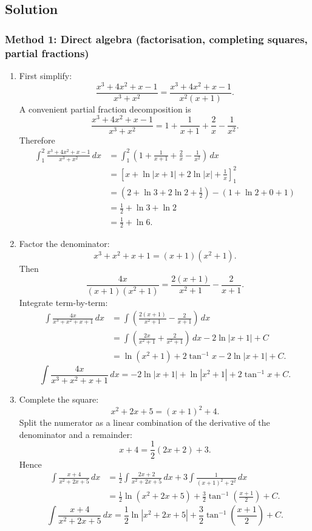 \documentclass[12pt]{article}
\begin{document}
\subsection*{Solution}

\subsubsection*{Method 1: Direct algebra (factorisation, completing squares, partial fractions)}

\begin{enumerate}[label=(\alph*)]
\item First simplify:
\[
\frac{x^{3}+4x^{2}+x-1}{x^{3}+x^{2}}
=\frac{x^{3}+4x^{2}+x-1}{x^{2}(x+1)}.
\]
A convenient partial fraction decomposition is
\[
\frac{x^{3}+4x^{2}+x-1}{x^{3}+x^{2}}
=
1+\frac{1}{x+1}+\frac{2}{x}-\frac{1}{x^{2}}.
\]
Therefore
\begin{align*}
\int_{1}^{2}\frac{x^{3}+4x^{2}+x-1}{x^{3}+x^{2}}\,dx
&=\int_{1}^{2}\left(1+\frac{1}{x+1}+\frac{2}{x}-\frac{1}{x^{2}}\right)\,dx\\
&=\left[x+\ln|x+1|+2\ln|x|+\frac{1}{x}\right]_{1}^{2}\\
&=\left(2+\ln 3+2\ln 2+\frac{1}{2}\right)-\left(1+\ln 2+0+1\right)\\
&=\frac{1}{2}+\ln 3+\ln 2\\
&=\boxed{\frac{1}{2}+\ln 6.}
\end{align*}

\item Factor the denominator:
\[
x^{3}+x^{2}+x+1=(x+1)(x^{2}+1).
\]
Then
\[
\frac{4x}{(x+1)(x^{2}+1)}
=\frac{2(x+1)}{x^{2}+1}-\frac{2}{x+1}.
\]
Integrate term-by-term:
\begin{align*}
\int \frac{4x}{x^{3}+x^{2}+x+1}\,dx
&=\int \left(\frac{2(x+1)}{x^{2}+1}-\frac{2}{x+1}\right)\,dx\\
&=\int \left(\frac{2x}{x^{2}+1}+\frac{2}{x^{2}+1}\right)\,dx - 2\ln|x+1| + C\\
&=\ln(x^{2}+1)+2\tan^{-1}x - 2\ln|x+1| + C.
\end{align*}
\[
\boxed{\int \frac{4x}{x^{3}+x^{2}+x+1}\,dx
= -2\ln|x+1|+\ln|x^{2}+1|+2\tan^{-1}x+C.}
\]

\item Complete the square:
\[
x^{2}+2x+5=(x+1)^{2}+4.
\]
Split the numerator as a linear combination of the derivative of the denominator and a remainder:
\[
x+4=\frac{1}{2}(2x+2)+3.
\]
Hence
\begin{align*}
\int \frac{x+4}{x^{2}+2x+5}\,dx
&=\frac{1}{2}\int \frac{2x+2}{x^{2}+2x+5}\,dx + 3\int \frac{1}{(x+1)^{2}+2^{2}}\,dx\\
&=\frac{1}{2}\ln(x^{2}+2x+5)+\frac{3}{2}\tan^{-1}\!\left(\frac{x+1}{2}\right)+C.
\end{align*}
\[
\boxed{\int \frac{x+4}{x^{2}+2x+5}\,dx
=\frac{1}{2}\ln|x^{2}+2x+5|+\frac{3}{2}\tan^{-1}\!\left(\frac{x+1}{2}\right)+C.}
\]


\end{enumerate}
\end{document}
